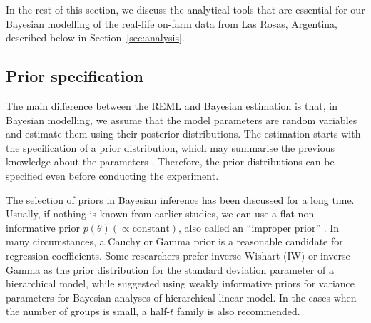 \documentclass[a4paper]{article}   	%
\begin{document}
	In the rest of this section, we discuss the analytical tools that are essential for our Bayesian modelling of the real-life on-farm data from Las Rosas, Argentina, described below in Section~\ref{sec:analysis}.
	
	\subsection{Prior specification}
	
	The main difference between the REML and Bayesian estimation is that, in Bayesian modelling, we assume that the model parameters are random variables and estimate them using their posterior distributions. The estimation starts with the specification of a prior distribution, which may summarise the previous knowledge about the parameters \parencite{Onofri2019Analysing}. Therefore, the prior distributions can be specified even before conducting the experiment. 
	
	The selection of priors in Bayesian inference has been discussed for a long time. Usually, if nothing is known from earlier studies, we can use a flat non-informative prior $p(\theta) (\propto \mbox{constant})$, also called an ``improper prior'' \parencite{gelman2006Prior}. In many circumstances, a Cauchy or Gamma prior is a reasonable candidate for regression coefficients. Some researchers prefer inverse Wishart (IW) or inverse Gamma as the prior distribution for the standard deviation parameter of a hierarchical model, while \textcite{gelman2006Prior,gelman2017Prior} suggested using weakly informative priors for variance parameters for Bayesian analyses of hierarchical linear model. In the cases when the number of groups is small, a half-$t$ family is also recommended.
	
\end{document}
